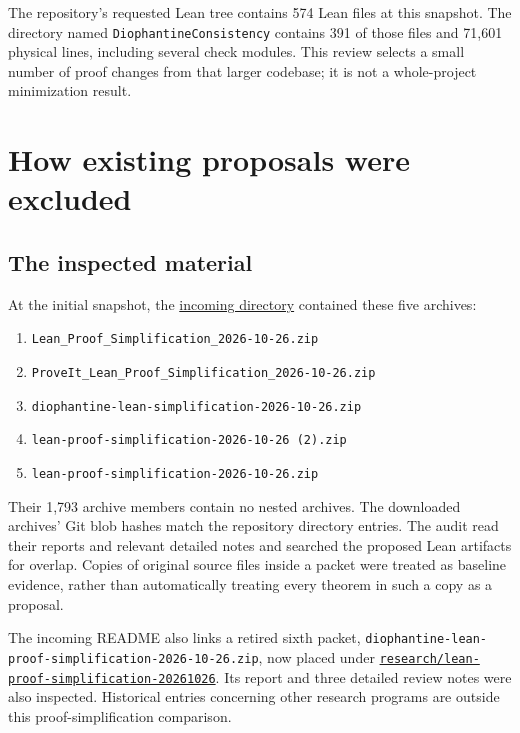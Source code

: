\documentclass[11pt,letterpaper]{article}
\newcommand{\code}[1]{\nolinkurl{#1}}
\newcommand{\repo}[2]{\href{https://github.com/VladimirReshetnikov/ProveIt/blob/b310142330df89e48413c8fce62e7de223e1c7d5/#1}{#2}}
\begin{document}
The repository's requested Lean tree contains 574 Lean files at this snapshot.
The directory named \code{DiophantineConsistency} contains 391 of those files
and 71,601 physical lines, including several check modules. This review selects
a small number of proof changes from that larger codebase; it is not a
whole-project minimization result.

\section{How existing proposals were excluded}
\label{sec:novelty}

\subsection{The inspected material}

At the initial snapshot, the \repo{docs/incoming}{incoming directory} contained
these five archives:

\begin{enumerate}
\item \code{Lean_Proof_Simplification_2026-10-26.zip}
\item \code{ProveIt_Lean_Proof_Simplification_2026-10-26.zip}
\item \code{diophantine-lean-simplification-2026-10-26.zip}
\item \code{lean-proof-simplification-2026-10-26 (2).zip}
\item \code{lean-proof-simplification-2026-10-26.zip}
\end{enumerate}

Their 1,793 archive members contain no nested archives. The downloaded
archives' Git blob hashes match the repository directory entries. The audit
read their reports and relevant detailed notes and searched the proposed Lean
artifacts for overlap. Copies of original source files inside a packet were
treated as baseline evidence, rather than automatically treating every theorem
in such a copy as a proposal.

The incoming README also links a retired sixth packet,
\code{diophantine-lean-proof-simplification-2026-10-26.zip}, now placed under
\repo{Computability/DiophantineConsistency/research/lean-proof-simplification-20261026/PLACEMENT.md}{\code{research/lean-proof-simplification-20261026}}.
Its report and three detailed review notes were also inspected. Historical
entries concerning other research programs are outside this proof-simplification
comparison.
\end{document}
